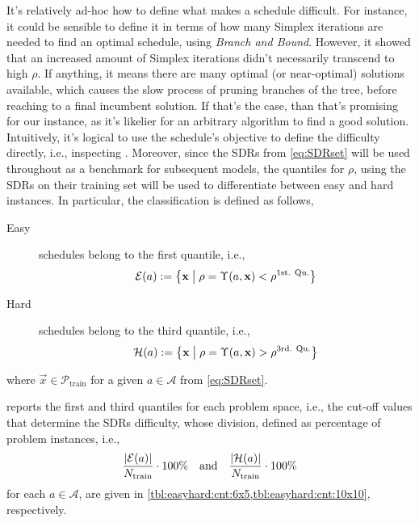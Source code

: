 It's relatively ad-hoc how to define what makes a schedule difficult. 
For instance, it could be sensible to define it in terms of how many Simplex 
iterations are needed to find an optimal schedule, using \emph{Branch and 
Bound}. However, it showed that an increased amount of Simplex iterations 
didn't necessarily transcend to high $\rho$. 
If anything, it means there are many optimal (or near-optimal) solutions 
available, which causes the slow process of pruning branches of the tree, 
before reaching to a final incumbent solution. If that's the case, than that's 
promising for our instance, as it's likelier for an arbitrary algorithm to find 
a good solution. 
Intuitively, it's logical to use the schedule's objective to define the 
difficulty directly, i.e., inspecting \namerho. Moreover, since the SDRs from 
\cref{eq:SDRset} will be used throughout as a benchmark for subsequent models, 
the quantiles for $\rho$, using the SDRs on their training set will be used 
to differentiate between easy and hard instances. In particular, the 
classification is defined as follows, 
\begin{description}
  \item[Easy] schedules belong to the first quantile, i.e., \hfill \\
  \begin{equation}\label{eq:easy}
    \mathcal{E}(a):=\condset{\vec{x}}{
      \rho=\Upsilon(a,\vec{x})<\rho^{\text{1st. Qu.}}}
  \end{equation} 
  \item[Hard] schedules belong to the third quantile, i.e., \hfill \\
  \begin{equation}\label{eq:hard}
    \mathcal{H}(a):=\condset{\vec{x}}{
      \rho=\Upsilon(a,\vec{x})>\rho^{\text{3rd. Qu.}}}
  \end{equation} 
\end{description}
where $\vec{x}\in\mathcal{P}_{\text{train}}$ for a given $a\in\mathcal{A}$ from 
\cref{eq:SDRset}.

 

 reports the first and third quantiles for each 
problem space, i.e., the cut-off values that determine the SDRs difficulty, 
whose division, defined as percentage of problem instances, i.e., 
\begin{equation}\label{eq:easyhard:cnt}
  \frac{\abs{\mathcal{E}(a)}}{N_{\text{train}}} \cdot 100\%
  \quad \text{and} \quad 
  \frac{\abs{\mathcal{H}(a)}}{N_{\text{train}}}\cdot 100\%
\end{equation}
for each $a\in\mathcal{A}$, are given in \cref{tbl:easyhard:cnt:6x5,tbl:easyhard:cnt:10x10}, respectively. 

